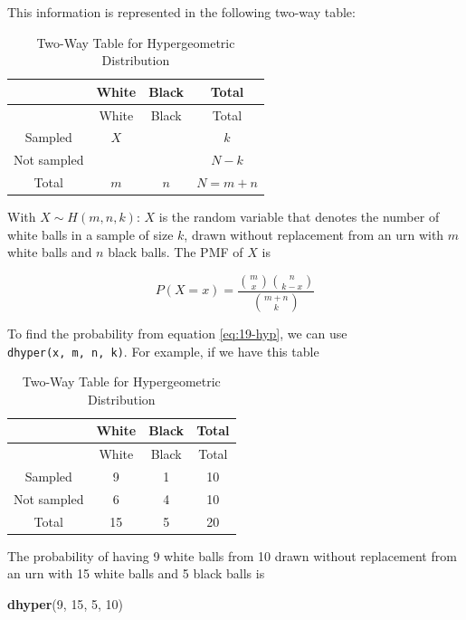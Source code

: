 \documentclass[
]{book}
\newenvironment{Shaded}{\begin{snugshade}}{\end{snugshade}}
\newcommand{\DecValTok}[1]{\textcolor[rgb]{0.00,0.00,0.81}{#1}}
\newcommand{\FunctionTok}[1]{\textcolor[rgb]{0.13,0.29,0.53}{\textbf{#1}}}
\newcommand{\NormalTok}[1]{#1}
\theoremstyle{definition}
\theoremstyle{definition}
\theoremstyle{definition}
\theoremstyle{definition}
\theoremstyle{remark}
\begin{document}
This information is represented in the following two-way table:

\begin{longtable}[]{@{}cccc@{}}
\caption{\label{tab:hyper} Two-Way Table for Hypergeometric Distribution}\tabularnewline
\toprule\noalign{}
& White & Black & Total \\
\midrule\noalign{}
\endfirsthead
\toprule\noalign{}
& White & Black & Total \\
\midrule\noalign{}
\endhead
\bottomrule\noalign{}
\endlastfoot
Sampled & \(X\) & & \(k\) \\
Not sampled & & & \(N - k\) \\
Total & \(m\) & \(n\) & \(N = m+n\) \\
\end{longtable}

With \(X \sim H(m, n, k)\): \(X\) is the random variable that denotes the number of white balls in a sample of size \(k\), drawn without replacement from an urn with \(m\) white balls and \(n\) black balls. The PMF of \(X\) is

\begin{equation} 
P(X=x) = \frac{\binom{m}{x} \binom{n}{k-x}}{\binom{m + n}{k}}
\label{eq:19-hyp}
\end{equation}

To find the probability from equation \eqref{eq:19-hyp}, we can use \texttt{dhyper(x,\ m,\ n,\ k)}. For example, if we have this table

\begin{longtable}[]{@{}cccc@{}}
\caption{\label{tab:hyper2} Two-Way Table for Hypergeometric Distribution}\tabularnewline
\toprule\noalign{}
& White & Black & Total \\
\midrule\noalign{}
\endfirsthead
\toprule\noalign{}
& White & Black & Total \\
\midrule\noalign{}
\endhead
\bottomrule\noalign{}
\endlastfoot
Sampled & 9 & 1 & 10 \\
Not sampled & 6 & 4 & 10 \\
Total & 15 & 5 & 20 \\
\end{longtable}

The probability of having 9 white balls from 10 drawn without replacement from an urn with 15 white balls and 5 black balls is

\begin{Shaded}
\begin{Highlighting}[]
\FunctionTok{dhyper}\NormalTok{(}\DecValTok{9}\NormalTok{, }\DecValTok{15}\NormalTok{, }\DecValTok{5}\NormalTok{, }\DecValTok{10}\NormalTok{)}
\end{Highlighting}
\end{Shaded}
\end{document}
